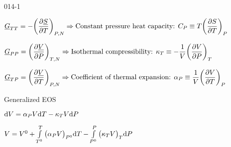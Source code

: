 \begin{mitframe}{014-1} %

    
\begin{listone}
        
    \item $\uline{\gibbs}_{\Temp\Temp} = -\bigg(\dfrac{\partial\uline{\entropy}}{\partial\Temp}\bigg)_{\p,\nummoles}\Rightarrow\text{Constant pressure heat capacity: }\cp\equiv\Temp\bigg(\dfrac{\partial\entropy}{\partial\Temp}\bigg)_{\p}$
    
        
    \item $\uline{\gibbs}_{\p\p} = \bigg(\dfrac{\partial\uline{\vol}}{\partial\p}\bigg)_{\Temp,\nummoles}\Rightarrow\text{Isothermal compressibility: }\comeback_{\Temp}\equiv-\dfrac{1}{\vol}\bigg(\dfrac{\partial\vol}{\partial\p}\bigg)_{\Temp}$
    
         
    \item $\uline{\gibbs}_{\Temp\p} = \bigg(\dfrac{\partial\uline{\vol}}{\partial\Temp}\bigg)_{\p,\nummoles}\Rightarrow\text{Coefficient of thermal expansion: }\tdiff_{\p} \equiv \dfrac{1}{\vol}\bigg(\dfrac{\partial\vol}{\partial\Temp}\bigg)_{\p}$
    
    
    
    \item Generalized EOS
    
    \begin{listtwo}
		
        \item $\mathrm{d}\vol=\tdiff_{\p}\vol\mathrm{d}\Temp-\comeback_{\Temp}\vol\mathrm{d}\p$
        
        \item $\vol = \vol^{\init}+\int\limits_{\Temp^{\init}}^{\Temp}\big(\tdiff_{\p}\vol\big)_{\p^{\init}}\mathrm{d}\Temp-\int\limits_{\p^{\init}}^{\p}\big(\comeback_{\Temp}\vol\big)_{\Temp}\mathrm{d}\p$
        
	\end{listtwo}

\end{listone}			

\end{mitframe}